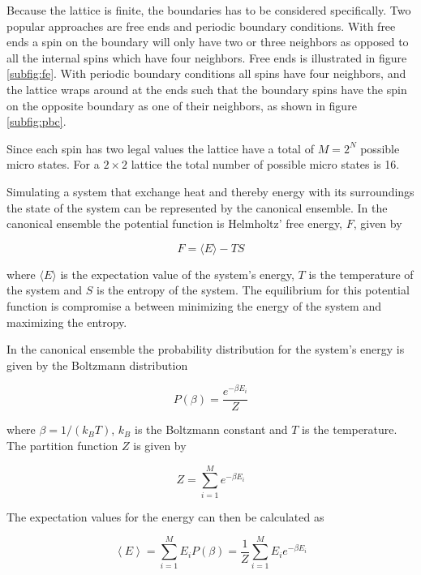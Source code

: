 \documentclass{article}
\begin{document}
Because the lattice is finite, the boundaries has to be considered specifically. Two popular approaches are free ends and periodic boundary conditions. With free ends a spin on the boundary will only have two or three neighbors as opposed to all the internal spins which have four neighbors. Free ends is illustrated in figure \ref{subfig:fe}. With periodic boundary conditions all spins have four neighbors, and the lattice wraps around at the ends such that the boundary spins have the spin on the opposite boundary as one of their neighbors, as shown in figure \ref{subfig:pbc}.

Since each spin has two legal values the lattice have a total of $M=2^N$ possible micro states. For a $2\times 2$ lattice the total number of possible micro states is 16. 

Simulating a system that exchange heat and thereby energy with its surroundings the state of the system can be represented by the canonical ensemble. In the canonical ensemble the potential function is Helmholtz' free energy, $F$, given by

\begin{equation}
F = \langle E \rangle - TS
\label{eq:free_energy}
\end{equation}

\noindent where $\langle E \rangle$ is the expectation value of the system's energy, $T$ is the temperature of the system and $S$ is the entropy of the system. The equilibrium for this potential function is compromise a between minimizing the energy of the system and maximizing the entropy. 

In the canonical ensemble the probability distribution for the system's energy is given by the Boltzmann distribution

\begin{equation}
P(\beta) = \frac{e^{-\beta E_i}}{Z}
\label{eq:boltzmann}
\end{equation}

\noindent where $\beta=1/(k_BT)$, $k_B$ is the Boltzmann constant and $T$ is the temperature. The partition function $Z$ is given by

\begin{equation}
Z = \sum\limits_{i=1}^M e^{-\beta E_i}
\label{eq:partition}
\end{equation}

\noindent The expectation values for the energy can then be calculated as 

\begin{equation}
\left\langle E \right\rangle = \sum\limits_{i=1}^M E_iP(\beta) = \frac{1}{Z} \sum\limits_{i=1}^M E_ie^{-\beta E_i}
\label{eq:mean_E}
\end{equation}
\end{document}
